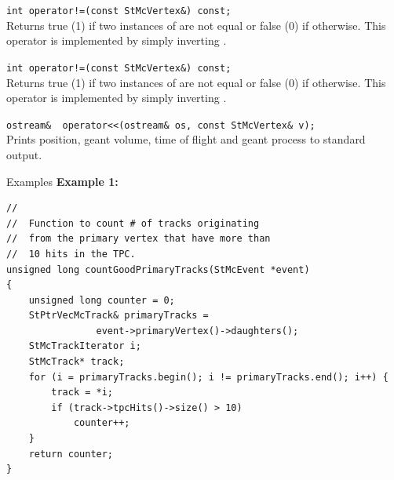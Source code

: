 \begin{Entry}
    \verb+int operator!=(const StMcVertex&) const;+\\
    Returns true (1) if two instances of  are not equal or false (0)
    if otherwise.
    This operator is implemented by simply inverting .

    \verb+int operator!=(const StMcVertex&) const;+\\
    Returns true (1) if two instances of  are not equal or false (0)
    if otherwise.
    This operator is implemented by simply inverting .

    \verb+ostream&  operator<<(ostream& os, const StMcVertex& v);+\\
    Prints position, geant volume, time of flight and geant process to standard
    output.

\item[Examples] 
{\bf Example 1:}
{\footnotesize
\begin{verbatim}
//
//  Function to count # of tracks originating
//  from the primary vertex that have more than
//  10 hits in the TPC.
unsigned long countGoodPrimaryTracks(StMcEvent *event)
{
    unsigned long counter = 0;
    StPtrVecMcTrack& primaryTracks =
                event->primaryVertex()->daughters();
    StMcTrackIterator i;
    StMcTrack* track;
    for (i = primaryTracks.begin(); i != primaryTracks.end(); i++) {
        track = *i;
        if (track->tpcHits()->size() > 10)
            counter++;
    }
    return counter;
}
\end{verbatim}
}%

\end{Entry}
\clearpage
%
%

\printindex


\bye

%
%

%
%
